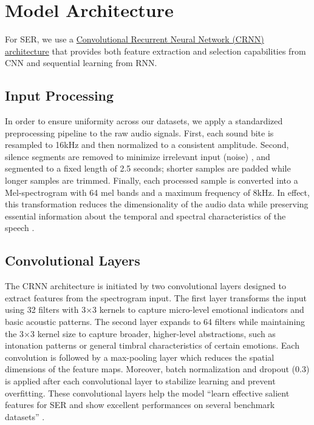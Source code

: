 \documentclass[../main.tex]{subfiles}
\begin{document}
\section{Model Architecture}
For SER, we use a \hyperref[fig:architecture]{Convolutional Recurrent Neural Network (CRNN) architecture}
that provides both feature extraction and selection capabilities 
from CNN and sequential learning from RNN. 

\subsection{Input Processing}
In order to ensure uniformity across our datasets, we apply a standardized
preprocessing pipeline to the raw audio signals. First, each sound bite is
resampled to 16kHz and then normalized to a consistent amplitude. Second,
silence segments are removed to minimize irrelevant input (noise) \citep{Orhan2021}, and segmented
to a fixed length of 2.5 seconds; shorter samples are padded while longer samples are trimmed.
Finally, each processed sample is converted into a Mel-spectrogram with 64 mel bands and a maximum frequency of 8kHz. In effect,
this transformation reduces the dimensionality of the audio data while
preserving essential information about the temporal and spectral characteristics
of the speech \citep{Orhan2021}.

\subsection{Convolutional Layers}
The CRNN architecture is initiated by two convolutional layers designed to extract 
features from the spectrogram input. The first layer transforms the input using 32 filters 
with 3×3 kernels to capture micro-level emotional indicators and basic acoustic patterns. 
The second layer expands to 64 filters while maintaining the 3×3 kernel size to capture broader, higher-level
abstractions, such as intonation patterns or general timbral characteristics of
certain emotions. Each convolution is followed by a max-pooling layer which
reduces the spatial dimensions of the feature maps. Moreover, batch
normalization and dropout (0.3) is applied after each convolutional layer to stabilize
learning and prevent overfitting. These convolutional layers help the model ``learn effective salient features for SER and show excellent performances on several benchmark datasets'' \citep{Chen2018}.
\end{document}
